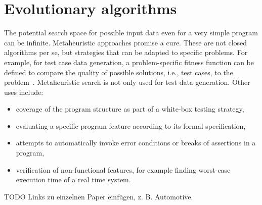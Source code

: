 \documentclass[paper=a4,%
  twoside,%
  BCOR4mm,%
  abstract=true,%
  toc=bibliography,%
  chapterprefix=true,%
  toc=bibliographynumbered,%
  open=right,%
  english,%
  pagesize=pdftex]{scrreprt}
\begin{document}
\section{Evolutionary algorithms}
The potential search space for possible input data even for a very simple program can be infinite. Metaheuristic approaches promise a cure. These are not closed algorithms per se, but strategies that can be adapted to specific problems. For example, for test case data generation, a problem-specific fitness function can be defined to compare the quality of possible solutions, i.e., test cases, to the problem~\cite{McMinn_2004}. Metaheuristic search is not only used for test data generation. Other uses include:
\begin{itemize}
	\item coverage of the program structure as part of a white-box testing strategy,
	\item evaluating a specific program feature according to its formal specification,
	\item attempts to automatically invoke error conditions or breaks of assertions in a program,
	\item verification of non-functional features, for example finding worst-case execution time of a real time system.
\end{itemize}
TODO Links zu einzelnen Paper einfügen, z. B. Automotive.

\end{document}
